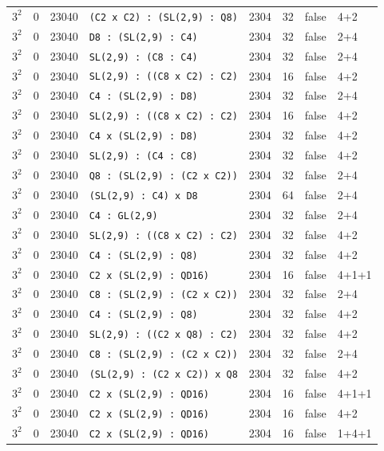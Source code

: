 \begin{longtable}{llrlrrll}
$3^2$ & 0 & 23040 & \texttt{(C2 x C2) : (SL(2,9) : Q8)} & 2304 & 32 & false & 4+2\\
$3^2$ & 0 & 23040 & \texttt{D8 : (SL(2,9) : C4)} & 2304 & 32 & false & 2+4\\
$3^2$ & 0 & 23040 & \texttt{SL(2,9) : (C8 : C4)} & 2304 & 32 & false & 2+4\\
$3^2$ & 0 & 23040 & \texttt{SL(2,9) : ((C8 x C2) : C2)} & 2304 & 16 & false & 4+2\\
$3^2$ & 0 & 23040 & \texttt{C4 : (SL(2,9) : D8)} & 2304 & 32 & false & 2+4\\
$3^2$ & 0 & 23040 & \texttt{SL(2,9) : ((C8 x C2) : C2)} & 2304 & 16 & false & 4+2\\
$3^2$ & 0 & 23040 & \texttt{C4 x (SL(2,9) : D8)} & 2304 & 32 & false & 4+2\\
$3^2$ & 0 & 23040 & \texttt{SL(2,9) : (C4 : C8)} & 2304 & 32 & false & 4+2\\
$3^2$ & 0 & 23040 & \texttt{Q8 : (SL(2,9) : (C2 x C2))} & 2304 & 32 & false & 2+4\\
$3^2$ & 0 & 23040 & \texttt{(SL(2,9) : C4) x D8} & 2304 & 64 & false & 2+4\\
$3^2$ & 0 & 23040 & \texttt{C4 : GL(2,9)} & 2304 & 32 & false & 2+4\\
$3^2$ & 0 & 23040 & \texttt{SL(2,9) : ((C8 x C2) : C2)} & 2304 & 32 & false & 4+2\\
$3^2$ & 0 & 23040 & \texttt{C4 : (SL(2,9) : Q8)} & 2304 & 32 & false & 4+2\\
$3^2$ & 0 & 23040 & \texttt{C2 x (SL(2,9) : QD16)} & 2304 & 16 & false & 4+1+1\\
$3^2$ & 0 & 23040 & \texttt{C8 : (SL(2,9) : (C2 x C2))} & 2304 & 32 & false & 2+4\\
$3^2$ & 0 & 23040 & \texttt{C4 : (SL(2,9) : Q8)} & 2304 & 32 & false & 4+2\\
$3^2$ & 0 & 23040 & \texttt{SL(2,9) : ((C2 x Q8) : C2)} & 2304 & 32 & false & 4+2\\
$3^2$ & 0 & 23040 & \texttt{C8 : (SL(2,9) : (C2 x C2))} & 2304 & 32 & false & 2+4\\
$3^2$ & 0 & 23040 & \texttt{(SL(2,9) : (C2 x C2)) x Q8} & 2304 & 32 & false & 4+2\\
$3^2$ & 0 & 23040 & \texttt{C2 x (SL(2,9) : QD16)} & 2304 & 16 & false & 4+1+1\\
$3^2$ & 0 & 23040 & \texttt{C2 x (SL(2,9) : QD16)} & 2304 & 16 & false & 4+2\\
$3^2$ & 0 & 23040 & \texttt{C2 x (SL(2,9) : QD16)} & 2304 & 16 & false & 1+4+1\\

\end{longtable}
